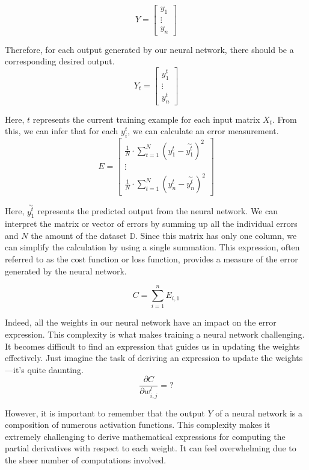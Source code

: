 \[
Y = \begin{bmatrix} y_1 \\ \vdots \\ y_n \end{bmatrix}
\]

Therefore, for each output generated by our neural network, there should be a corresponding desired output.
\[
Y_t = \begin{bmatrix} y_{1}^t \\ \vdots \\ y_{n}^t \end{bmatrix}
\]

Here, $t$ represents the current training example for each input matrix $X_t$.
From this, we can infer that for each $y_{i}^t$, we can calculate an error measurement.
\[
E =
\begin{bmatrix}
  \frac{1}{N} \cdot \sum_{t = 1}^{N}(y^t_{1} - \overset{\sim}{y_{1}^t})^2 \\ \vdots \\
  \frac{1}{N} \cdot \sum_{t = 1}^{N}(y^t_{n} - \overset{\sim}{y_{n}^t})^2
\end{bmatrix}
\]

Here, $\overset{\sim}{y_{1}^t}$
represents the predicted output from the neural network. We can interpret the matrix or vector
of errors by summing up all the individual errors and $N$ the amount of
the dataset $\mathbb{D}$. Since this matrix has only one column, we
can simplify the calculation by using a single summation. This expression, often referred to as
the cost function or loss function, provides a measure of the error generated by the neural network.

\[
C = \sum_{i = 1}^{n} E_{i, 1}
\]

Indeed, all the weights in our neural network have an impact on the error expression. This complexity is
what makes training a neural network challenging. It becomes difficult to find an expression that guides
us in updating the weights effectively. Just imagine the task of deriving an expression to update the
weights—it's quite daunting.
\[
\frac{\partial C}{\partial w_{i, j}^l} = ?
\]

However, it is important to remember that the output $Y$ of a neural network is a composition of numerous
activation functions. This complexity makes it extremely challenging to derive mathematical expressions for
computing the partial derivatives with respect to each weight. It can feel overwhelming due to the sheer number
of computations involved.

